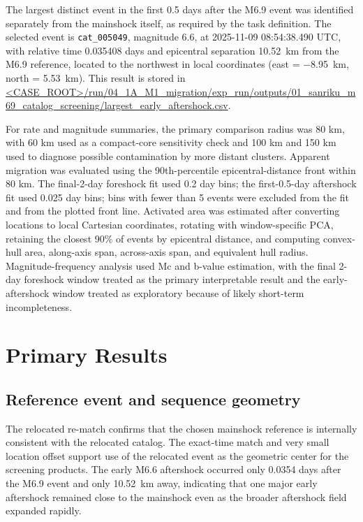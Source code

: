 \documentclass[11pt]{article}
\begin{document}
The largest distinct event in the first 0.5 days after the M6.9 event was identified separately from the mainshock itself, as required by the task definition. The selected event is \texttt{cat\_005049}, magnitude 6.6, at 2025-11-09 08:54:38.490 UTC, with relative time 0.035408 days and epicentral separation \SI{10.52}{km} from the M6.9 reference, located to the northwest in local coordinates (east = \SI{-8.95}{km}, north = \SI{5.53}{km}). This result is stored in \url{<CASE_ROOT>/run/04_1A_M1_migration/exp_run/outputs/01_sanriku_m69_catalog_screening/largest_early_aftershock.csv}.

For rate and magnitude summaries, the primary comparison radius was 80 km, with 60 km used as a compact-core sensitivity check and 100 km and 150 km used to diagnose possible contamination by more distant clusters. Apparent migration was evaluated using the 90th-percentile epicentral-distance front within 80 km. The final-2-day foreshock fit used 0.2 day bins; the first-0.5-day aftershock fit used 0.025 day bins; bins with fewer than 5 events were excluded from the fit and from the plotted front line. Activated area was estimated after converting locations to local Cartesian coordinates, rotating with window-specific PCA, retaining the closest 90\% of events by epicentral distance, and computing convex-hull area, along-axis span, across-axis span, and equivalent hull radius. Magnitude-frequency analysis used Mc and b-value estimation, with the final 2-day foreshock window treated as the primary interpretable result and the early-aftershock window treated as exploratory because of likely short-term incompleteness.

\section{Primary Results}

\subsection{Reference event and sequence geometry}
The relocated re-match confirms that the chosen mainshock reference is internally consistent with the relocated catalog. The exact-time match and very small location offset support use of the relocated event as the geometric center for the screening products. The early M6.6 aftershock occurred only 0.0354 days after the M6.9 event and only \SI{10.52}{km} away, indicating that one major early aftershock remained close to the mainshock even as the broader aftershock field expanded rapidly.
\end{document}
